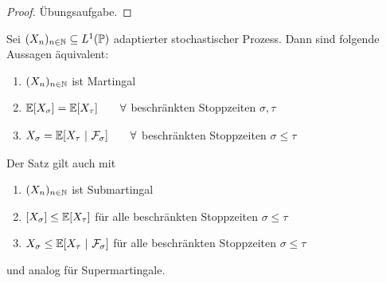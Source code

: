 \begin{proof}
	Übungsaufgabe.
\end{proof}

\begin{theorem}\enter\label{theorem3.4}
	Sei $(X_n)_{n\in\mathbb{N}}\subseteq L^1(\mathbb{P})$ adaptierter stochastischer Prozess. Dann sind folgende Aussagen äquivalent:
	\begin{enumerate}[label=(\alph*)]
		\item $(X_n)_{n\in\mathbb{N}}$ ist Martingal
		\item $\begin{aligned}
			\mathbb{E}[X_\sigma]=\mathbb{E}[X_\tau]\qquad\forall
		\end{aligned}$ beschränkten Stoppzeiten $\sigma,\tau$
		\item $\begin{aligned}
			X_\sigma=\mathbb{E}[X_\tau~|~\mathcal{F}_\sigma]\qquad\forall
		\end{aligned}$  beschränkten Stoppzeiten $\sigma\leq\tau$
	\end{enumerate}
\end{theorem}

\begin{bemerkung}
	Der Satz gilt auch mit 
	\begin{enumerate}[label=(\alph*')]
		\item $(X_n)_{n\in\mathbb{N}}$ ist Submartingal
		\item $[X_\sigma]\leq\mathbb{E}[X_\tau]$ für alle beschränkten Stoppzeiten $\sigma\leq\tau$
		\item $X_\sigma\leq\mathbb{E}[X_\tau~|~\mathcal{F}_\sigma]$ für alle beschränkten Stoppzeiten $\sigma\leq\tau$
	\end{enumerate}
	und analog für Supermartingale.
\end{bemerkung}

